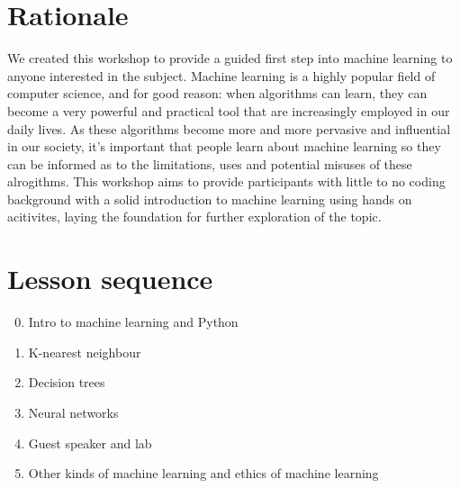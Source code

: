 \documentclass[11pt]{article}
\begin{document}
\section*{Rationale}

We created this workshop to provide a guided first step into machine learning to
anyone interested in the subject.
Machine learning is a highly popular field of computer science, and for good
reason:
when algorithms can learn, they can become a very powerful and practical tool
that are increasingly employed in our daily lives.
As these algorithms become more and more pervasive and influential in our
society, it's important that people learn about machine learning so they can be
informed as to the limitations, uses and potential misuses of these alrogithms.
This workshop aims to provide participants with little to no coding
background with a solid introduction to machine learning using hands on
acitivites, laying the foundation for further exploration of the topic.

\section*{Lesson sequence}

\begin{enumerate}
    \setcounter{enumi}{-1}
  \item Intro to machine learning and Python
  \item K-nearest neighbour
  \item Decision trees
  \item Neural networks
  \item Guest speaker and lab
  \item Other kinds of machine learning and ethics of machine learning
\end{enumerate}
\end{document}
